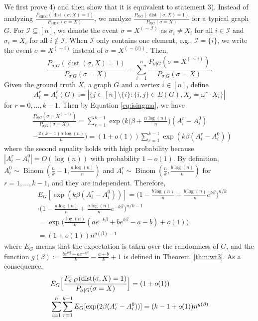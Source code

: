 \label{key}\documentclass[conference]{IEEEtran}
\DeclareMathOperator{\SIBM}{SIBM}
\newcommand{\cI}{\mathcal{I}}
\DeclareMathOperator{\dist}{dist}
\DeclareMathOperator{\Binom}{Binom}
\begin{document}
We first prove 4) and then show that it is equivalent to statement 3).
Instead of analyzing $\frac{P_{\SIBM} ( \dist(\sigma, X) = 1 )}{P_{\SIBM}(\sigma= X)}$, we analyze $\frac{P_{\sigma|G} ( \dist(\sigma, X) = 1 )}{P_{\sigma|G}(\sigma= X)}$ for a typical graph $G$.
For $\cI \subseteq [n]$, we denote the event $\sigma = X^{(\sim \cI)}$ as $\sigma_i \neq X_i$ for all $i \in \cI$ and $\sigma_i = X_i$ for all $i \not\in \cI$.
When $\cI$ only contains one element, e.g., $\cI=\{i\}$, we write the event $\sigma = X^{(\sim i)}$ instead of $\sigma = X^{(\sim\{i\})}$.
Then,
$$
\frac{P_{\sigma|G} ( \dist(\sigma, X) = 1 )}{P_{\sigma|G}(\sigma= X)}
=\sum_{i=1}^n \frac{P_{\sigma|G} ( \sigma= X^{(\sim i)} )} {P_{\sigma|G}(\sigma= X)} .
$$
Given the ground truth $X$, a graph $G$ and a vertex $i\in[n]$, define
\begin{equation*}
A^r_i=A^r_i(G):=|\{j\in[n]\setminus\{i\}:\{i,j\}\in E(G), X_j=\omega^r \cdot X_i\} |
\end{equation*}
for $ r=0, \dots, k-1$.
Then by Equation \eqref{eq:isingma}, we have
\begin{align}
&\frac{P_{\sigma|G}(\sigma=X^{(\sim i)} )}
{P_{\sigma|G}(\sigma=X)}
 = \sum_{r=1}^{k-1}\exp\Big(k\big(\beta+\frac{\alpha\log(n)}{n} \big) (A^r_i-A^0_i) \nonumber\\
&-\frac{2(k-1)\alpha\log(n)}{n} \Big) 
 = (1+o(1)) \sum_{r=1}^{k-1}\exp (k \beta(A^r_i-A^0_i)) \label{eq:kbetaA}
\end{align}
where the second equality holds with high probability because $|A^r_i-A^0_i|=O(\log(n))$ with probability $1-o(1)$.
By definition,
$A^0_i\sim \Binom(\frac{n}{k}-1,\frac{a\log(n)}{n})$ and $A^r_i\sim \Binom(\frac{n}{k}, \frac{b\log(n)}{n})$ for $r=1,\dots, k-1$, and they are independent. Therefore,
\begin{align}
&E_G[\exp (k \beta (A^r_i-A^0_i))]
 =\Big(1-\frac{b\log(n)}{n}+\frac{b\log(n)}{n} e^{k\beta} \Big)^{n/k} \nonumber \\
&\cdot \Big(1-\frac{a\log(n)}{n}+\frac{a\log(n)}{n} e^{-k\beta} \Big)^{n/k-1}\nonumber\\
& = 
\exp\Big(\frac{\log(n)}{k} ( a e^{-k\beta}+b e^{k\beta} -a-b )
+o(1) \Big)\nonumber \\
& = (1+o(1)) n^{g(\beta)-1} \label{eq:gbetaminus1}
\end{align}
where $E_G$ means that the expectation is taken over the randomness of $G$, and the function
$g(\beta)  := \frac{b e^{k\beta}+a e^{-k\beta}}{k}-\frac{a+b}{k}+1$ is defined in Theorem~\ref{thm:wt3}.
As a consequence,
\begin{align} \label{eq:mew}
&E_G \Big[ \frac{P_{\sigma|G} ( \dist(\sigma, X) = 1 )}{P_{\sigma|G}(\sigma= X)} \Big]
= (1+o(1)) \notag\\
&\sum_{i=1}^n\sum_{r=1}^{k-1} E_G[\exp (2 \beta (A^r_i-A^0_i))]
= (k-1+o(1)) n^{g(\beta)} 
\end{align}
\end{document}
